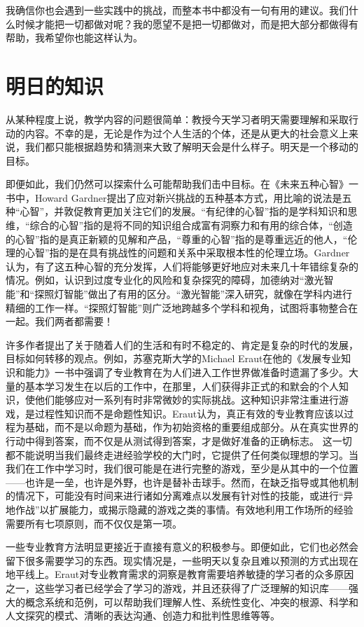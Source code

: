 我确信你也会遇到一些实践中的挑战，而整本书中都没有一句有用的建议。我们什么时候才能把一切都做对呢？我的愿望不是把一切都做对，而是把大部分都做得有帮助，我希望你也能这样认为。

\section*{明日的知识}

从某种程度上说，教学内容的问题很简单：教授今天学习者明天需要理解和采取行动的内容。不幸的是，无论是作为过个人生活的个体，还是从更大的社会意义上来说，我们都只能根据趋势和猜测来大致了解明天会是什么样子。明天是一个移动的目标。

即便如此，我们仍然可以探索什么可能帮助我们击中目标。在《未来五种心智》一书中，Howard Gardner提出了应对新兴挑战的五种基本方式，用比喻的说法是五种“心智”，并敦促教育更加关注它们的发展。“有纪律的心智”指的是学科知识和思维，“综合的心智”指的是将不同的知识组合成富有洞察力和有用的综合体，“创造的心智”指的是真正新颖的见解和产品，“尊重的心智”指的是尊重远近的他人，“伦理的心智”指的是在具有挑战性的问题和关系中采取根本性的伦理立场。Gardner认为，有了这五种心智的充分发挥，人们将能够更好地应对未来几十年错综复杂的情况。例如，认识到过度专业化的风险和复杂探究的障碍，加德纳对“激光智能”和“探照灯智能”做出了有用的区分。“激光智能”深入研究，就像在学科内进行精细的工作一样。“探照灯智能”则广泛地跨越多个学科和视角，试图将事物整合在一起。我们两者都需要！

许多作者提出了关于随着人们的生活和有时不稳定的、肯定是复杂的时代的发展，目标如何转移的观点。例如，苏塞克斯大学的Michael Eraut在他的《发展专业知识和能力》一书中强调了专业教育在为人们进入工作世界做准备时遗漏了多少。大量的基本学习发生在以后的工作中，在那里，人们获得非正式的和默会的个人知识，使他们能够应对一系列有时非常微妙的实际挑战。这种知识非常注重进行游戏，是过程性知识而不是命题性知识。Eraut认为，真正有效的专业教育应该以过程为基础，而不是以命题为基础，作为初始资格的重要组成部分。从在真实世界的行动中得到答案，而不仅是从测试得到答案，才是做好准备的正确标志。
这一切都不能说明当我们最终走进经验学校的大门时，它提供了任何类似理想的学习。当我们在工作中学习时，我们很可能是在进行完整的游戏，至少是从其中的一个位置——也许是一垒，也许是外野，也许是替补击球手。然而，在缺乏指导或其他机制的情况下，可能没有时间来进行诸如分离难点以发展有针对性的技能，或进行“异地作战”以扩展能力，或揭示隐藏的游戏之类的事情。有效地利用工作场所的经验需要所有七项原则，而不仅仅是第一项。

一些专业教育方法明显更接近于直接有意义的积极参与。即便如此，它们也必然会留下很多需要学习的东西。现实情况是，一些明天以复杂且难以预测的方式出现在地平线上。Eraut对专业教育需求的洞察是教育需要培养敏捷的学习者的众多原因之一，这些学习者已经学会了学习的游戏，并且还获得了广泛理解的知识库——强大的概念系统和范例，可以帮助我们理解人性、系统性变化、冲突的根源、科学和人文探究的模式、清晰的表达沟通、创造力和批判性思维等等。

